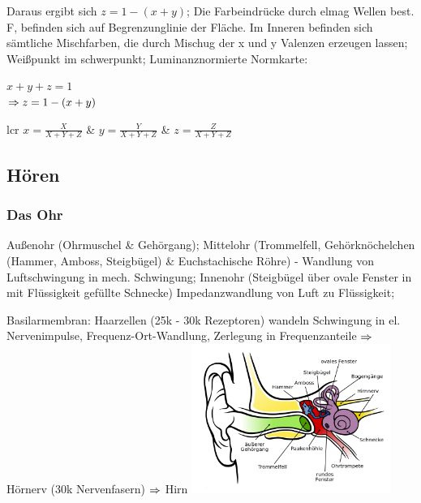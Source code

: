 \documentclass[german,color,6pt]{latex4ei/latex4ei_sheet}
\begin{document}
\begin{sectionbox}
Daraus ergibt sich $z = 1 - (x+y)$; Die Farbeindrücke durch elmag Wellen best. F, befinden sich auf Begrenzunglinie der Fläche. Im Inneren befinden sich sämtliche Mischfarben, die durch Mischug der x und y Valenzen erzeugen lassen; Weißpunkt im schwerpunkt; Luminanznormierte Normkarte:
\vspace{0.3em}

\begin{emphbox}
$x + y + z = 1$\\
$\Rightarrow z = 1 - (x+y)$
\end{emphbox}

\vspace{0.3em}

\begin{tablebox}{lcr}
	$x = \frac{X}{X + Y + Z}$ & $y = \frac{Y}{X + Y + Z}$ & $z = \frac{Z}{X + Y + Z}$\\
\end{tablebox}
\end{sectionbox}


\subsection{Hören}

\begin{sectionbox}
\subsubsection{Das Ohr}
 Außenohr (Ohrmuschel \& Gehörgang); Mittelohr (Trommelfell, Gehörknöchelchen (Hammer, Amboss, Steigbügel) \& Euchstachische Röhre) - Wandlung von Luftschwingung in mech. Schwingung; Innenohr (Steigbügel über ovale Fenster in mit Flüssigkeit gefüllte Schnecke) Impedanzwandlung von Luft zu Flüssigkeit;

Basilarmembran: Haarzellen (25k - 30k Rezeptoren) wandeln Schwingung in el. Nervenimpulse, Frequenz-Ort-Wandlung, Zerlegung in Frequenzanteile $\Rightarrow$ Hörnerv (30k Nervenfasern) $\Rightarrow$ Hirn
\includegraphics[width=6.5cm]{./img/Ohr.png}
\end{sectionbox}
\end{document}
